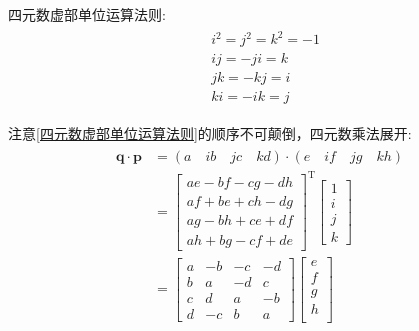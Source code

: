 \documentclass[12pt,a4paper]{article}
\renewcommand{\citep}[1]{\textsuperscript{\cite{#1}}}
\begin{document}
四元数虚部单位运算法则:
\begin{eqnarray}\label{四元数虚部单位运算法则}
    \begin{split}
        &i^2=j^2=k^2=-1 \\
        &ij=-ji=k \\
        &jk=-kj=i \\
        &ki=-ik=j
    \end{split}
\end{eqnarray} 

注意\ref{四元数虚部单位运算法则}的顺序不可颠倒，四元数乘法展开\citep{捷联惯导航}: 
\begin{eqnarray}\label{四元数乘法展开}
    \begin{split}
        \bm{q}\cdot \bm{p}
        &=(a\quad ib\quad jc\quad kd)\cdot(e\quad if\quad jg\quad kh) \\
        &=\left[\begin{matrix}
        ae-bf-cg-dh \\
        af+be+ch-dg \\
        ag-bh+ce+df \\
        ah+bg-cf+de
        \end{matrix}\right]^\mathrm{T}
        \left[\begin{matrix}
                1 \\ i \\ j \\ k
        \end{matrix}\right] \\
        &=\left[\begin{matrix}
        a &-b &-c &-d \\
        b & a &-d & c \\
        c & d & a &-b \\
        d &-c & b & a
        \end{matrix}\right]
        \left[\begin{matrix}
                e \\
                f \\
                g \\
                h \\
        \end{matrix}\right]
    \end{split}
\end{eqnarray} 
\end{document}
